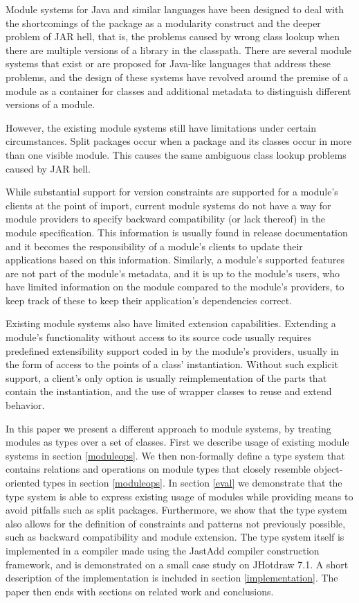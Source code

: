 Module systems for Java and similar languages have been designed 
to deal with the shortcomings of the package as a modularity construct
and the deeper problem of JAR hell, that is, the problems caused
by wrong class lookup when there are multiple versions of a library
in the classpath. There are several module systems that exist or are
proposed for Java-like languages \cite{javajars, OSGi4, netassemblies, JSR294, JSR277}
that address these problems, and the design of these systems have
revolved around the premise of a module as a container for classes
and additional metadata to distinguish different versions of a module.

However, the existing module systems still have limitations under 
certain circumstances. Split packages \cite{iJAMComments} occur when 
a package and its classes occur in more than one visible module. This
causes the same ambiguous class lookup problems caused by JAR hell.

While substantial support for version constraints are supported
for a module's clients at the point of import, current module 
systems do not have a way for module providers to specify backward 
compatibility (or lack thereof) in the module specification. 
This information is usually found in release documentation and 
it becomes the responsibility of a module's clients to update 
their applications based on this information. Similarly, a module's 
supported features are not part of the module's metadata, and it 
is up to the module's users, who have limited 
information on the module compared to the module's providers, to 
keep track of these to keep their application's dependencies correct.

Existing module systems also have limited extension capabilities. Extending
a module's functionality without access to its source code usually 
requires predefined extensibility support coded in by the module's 
providers, usually in the form of access to the points of a class' 
instantiation. Without such explicit support, a client's only option
is usually reimplementation of the parts that contain the instantiation, 
and the use of wrapper classes to reuse and extend behavior.

In this paper we present a different approach to module systems, 
by treating modules as types over a set of classes. First we describe 
usage of existing module systems in section \ref{moduleops}. We then non-formally
define a type system that contains relations and operations on module types 
that closely resemble object-oriented types in section \ref{moduleops}. 
In section \ref{eval} we demonstrate that the type
system is able to express existing usage of modules while providing means 
to avoid pitfalls such as split packages. 
Furthermore, we show that the type system also allows for the
definition of constraints and patterns not previously possible, such
as backward compatibility and module extension. The type system
itself is implemented in a compiler made using the JastAdd\cite{jastadd} compiler construction
framework, and is demonstrated on a small case study on JHotdraw 7.1.
A short description of the implementation is included in section \ref{implementation}.
The paper then ends with sections on related work and conclusions.
